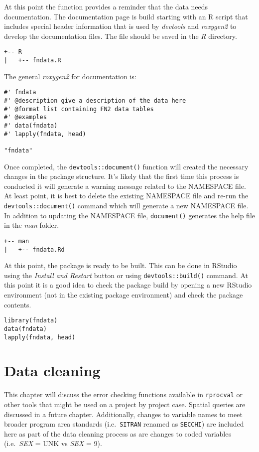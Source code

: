 \documentclass[
]{book}
\begin{document}
At this point the function provides a reminder that the data needs documentation. The documentation page is build starting with an R script that includes special header information that is used by \emph{devtools} and \emph{roxygen2} to develop the documentation files. The file should be saved in the \emph{R} directory.

\begin{verbatim}
+-- R
|   +-- fndata.R
\end{verbatim}

The general \emph{roxygen2} for documentation is:

\begin{verbatim}
#' fndata
#' @description give a description of the data here
#' @format list containing FN2 data tables
#' @examples
#' data(fndata)
#' lapply(fndata, head)

"fndata"
\end{verbatim}

Once completed, the \texttt{devtools::document()} function will created the necessary changes in the package structure. It's likely that the first time this process is conducted it will generate a warning message related to the NAMESPACE file. At least point, it is best to delete the existing NAMESPACE file and re-run the \texttt{devtools::document()} command which will generate a new NAMESPACE file. In addition to updating the NAMESPACE file, \texttt{document()} generates the help file in the \emph{man} folder.

\begin{verbatim}
+-- man
|   +-- fndata.Rd
\end{verbatim}

At this point, the package is ready to be built. This can be done in RStudio using the \emph{Install and Restart} button or using \texttt{devtools::build()} command. At this point it is a good idea to check the package build by opening a new RStudio environment (not in the existing package environment) and check the package contents.

\begin{verbatim}
library(fndata)
data(fndata)
lapply(fndata, head)
\end{verbatim}

\hypertarget{data-cleaning}{%
\chapter{Data cleaning}\label{data-cleaning}}

This chapter will discuss the error checking functions available in \texttt{rprocval} or other tools that might be used on a project by project case. Spatial queries are discussed in a future chapter. Additionally, changes to variable names to meet broader program area standards (i.e.~\texttt{SITRAN} renamed as \texttt{SECCHI}) are included here as part of the data cleaning process as are changes to coded variables (i.e.~\emph{SEX} = UNK vs \emph{SEX} = 9).
\end{document}
